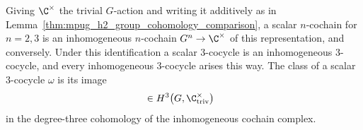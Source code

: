 \begin{definition}
    \label{def:mpug_h3_group_cohomology}
    \leanok
    Giving $\C^\times$ the trivial $G$-action and writing it additively as in
    Lemma~\ref{thm:mpug_h2_group_cohomology_comparison}, a scalar
    $n$-cochain for $n=2,3$ is an inhomogeneous $n$-cochain
    $G^n\to\C^\times$ of this representation, and conversely. Under this
    identification a scalar $3$-cocycle is an inhomogeneous $3$-cocycle, and
    every inhomogeneous $3$-cocycle arises this way. The class of a scalar
    $3$-cocycle $\omega$ is its image
    \begin{align}
        [\omega] & \in H^3\bigl(G,\C^\times_{\mathrm{triv}}\bigr)
        \label{eq:mpug_h3_class}
    \end{align}
    in the degree-three cohomology of the inhomogeneous cochain complex.
\end{definition}

